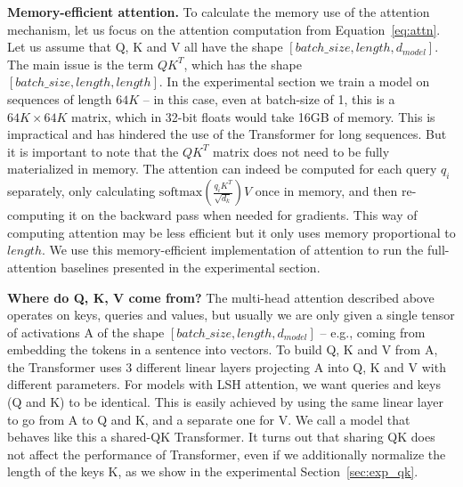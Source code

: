 \documentclass{article} \usepackage{iclr2020_conference,times}
\renewcommand{\paragraph}[1]{\textbf{#1}}
\begin{document}
\paragraph{Memory-efficient attention.}
To calculate the memory use of the attention mechanism, let us focus on
the attention computation from Equation~\ref{eq:attn}.
Let us assume that Q, K and V all have the shape
$[batch\_size, length, d_{model}]$. The main issue is
the term $QK^T$, which has the shape $[batch\_size, length, length]$.
In the experimental section we train a model on sequences of length
$64K$ -- in this case, even at batch-size of 1, this is a $64K \times 64K$
matrix, which in 32-bit floats would take 16GB of memory.
This is impractical and has hindered the use of the Transformer for long
sequences. But it is important to note that the $QK^T$ matrix does not
need to be fully materialized in memory. The attention can indeed be computed
for each query $q_i$ separately, only calculating $\mathrm{softmax}(\frac{q_iK^T}{\sqrt{d_k}})V$ 
once in memory, and then re-computing it on the backward pass when needed for gradients.
This way of computing attention may be less efficient but it only uses
memory proportional to $length$. We use this memory-efficient implementation
of attention to run the full-attention baselines presented in the experimental
section.

\paragraph{Where do Q, K, V come from?}
The multi-head attention described above operates on keys, queries and
values, but usually we are only given a single tensor of activations A
of the shape $[batch\_size, length, d_{model}]$ -- e.g., coming from
embedding the tokens in a sentence into vectors. To build Q, K and V
from A, the Transformer uses 3 different linear layers projecting A
into Q, K and V with different parameters. For models with LSH attention,
we want queries and keys (Q and K) to be identical. This is easily achieved
by using the same linear layer to go from A to Q and K, and a separate one
for V. We call a model that behaves like this a shared-QK Transformer.
It turns out that sharing QK does not affect the performance of Transformer,
even if we additionally normalize the length of the keys K,
as we show in the experimental Section~\ref{sec:exp_qk}.
\end{document}
